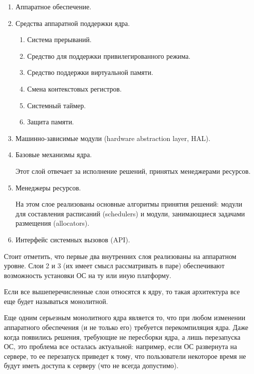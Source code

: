 \begin{enumerate}
\item
  Аппаратное обеспечение.  

\item
  Средства аппаратной поддержки ядра.
  
  \begin{enumerate}
  \item
    Система прерываний.

  \item
    Средство для поддержки привилегированного режима.

  \item
    Средство поддержки виртуальной памяти.

  \item
    Смена контекстовых регистров.

  \item
    Системный таймер.

  \item
    Защита памяти.
  \end{enumerate}

\item
  Машинно-зависимые модули (hardware abstraction layer, HAL).

\item
  Базовые механизмы ядра.

  Этот слой отвечает за исполнение решений, принятых менеджерами ресурсов.

\item
  Менеджеры ресурсов.

  На этом слое реализованы основные алгоритмы принятия решений: модули для
  составления расписаний (schedulers) и модули, занимающиеся задачами размещения
  (allocators).

\item
  Интерфейс системных вызовов (API).
\end{enumerate}

Стоит отметить, что первые два внутренних слоя реализованы на аппаратном уровне.
Слои 2 и 3 (их имеет смысл рассматривать в паре) обеспечивают возможность
установки ОС на ту или иную платформу.

\begin{remark}
  Если все вышеперечисленные слои относятся к ядру, то такая архитектура все еще
  будет называться монолитной.
\end{remark}

Еще одним серьезным монолитного ядра является то, что при любом изменении
аппаратного обеспечения (и не только его) требуется перекомпиляция ядра. Даже
когда появились решения, требующие не пересборки ядра, а лишь перезапуска ОС,
это проблема все осталась актуальной: например, если ОС развернута на сервере,
то ее перезапуск приведет к тому, что пользователи некоторое время не будут
иметь доступа к серверу (что не всегда допустимо).

